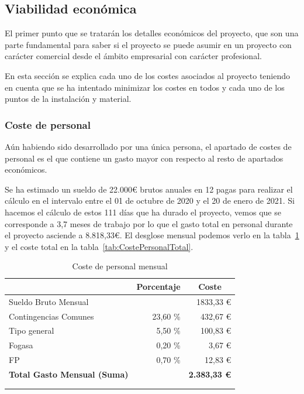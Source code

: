 \subsection{Viabilidad económica}
El primer punto que se tratarán los detalles económicos del proyecto, que son una parte fundamental para saber si el proyecto se puede asumir en un proyecto con carácter comercial desde el ámbito empresarial con carácter profesional.

En esta sección se explica cada uno de los costes asociados al proyecto teniendo en cuenta que se ha intentado minimizar los costes en todos y cada uno de los puntos de la instalación y material.

\subsubsection{Coste de personal}
Aún habiendo sido desarrollado por una única persona, el apartado de costes de personal es el que contiene un gasto mayor con respecto al resto de apartados económicos.

Se ha estimado un sueldo de 22.000€ brutos anuales en 12 pagas para realizar el cálculo en el intervalo entre el 01 de octubre de 2020 y el 20 de enero de 2021. Si hacemos el cálculo de estos 111 días que ha durado el proyecto, vemos que se corresponde a 3,7 meses de trabajo por lo que el gasto total en personal durante el proyecto asciende a 8.818,33€.
El desglose mensual podemos verlo en la tabla~\ref{tab:CostePersonal} y el coste total en la tabla~\ref{tab:CostePersonalTotal}.

\begin{longtable}[c]{@{}lrr@{}}
\toprule
\centering
\multicolumn{1}{c}{\textbf{Concepto}} & \multicolumn{1}{c}{\textbf{Porcentaje}} & \multicolumn{1}{c}{\textbf{Coste}} \\* \midrule
\endfirsthead
%
\endhead
%
\bottomrule
\endfoot
%
\endlastfoot
%
Sueldo Bruto Mensual &  & 1833,33 € \\
Contingencias Comunes & 23,60 \% & 432,67 € \\
Tipo general & 5,50 \% & 100,83 € \\
Fogasa & 0,20 \% & 3,67 € \\
FP & 0,70 \% & 12,83 € \\ \hline
\textbf{Total Gasto Mensual (Suma)} & & \textbf{2.383,33 €} \\* \bottomrule \\
\caption{Coste de personal mensual}
\label{tab:CostePersonal}
\end{longtable}


